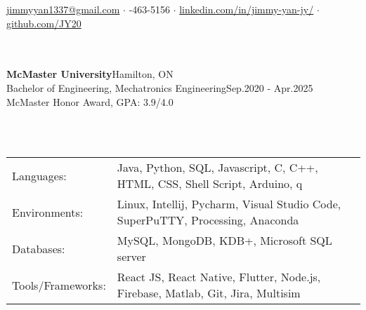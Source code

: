\documentclass[a4paper]{article}
\newcommand{\lineunder} {
    \vspace*{-8pt} \\
    \hspace*{-18pt} \hrulefill \\
}
\newcommand{\header} [1] {
    {\hspace*{-18pt}\vspace*{6pt} \textsc{#1}}
    \vspace*{-6pt} \lineunder
}
\begin{document}
\vspace*{-40pt}

\vspace*{-10pt}
\begin{center}
	\vspace{1mm}
	\color{black}
	\faSend \space \normalsize
	\href{mailto:jimmyyan1337@gmail.com}{jimmyyan1337@gmail.com} $\cdot$ 
	\faPhoneSquare {}-463-5156 $\cdot$ \faLinkedinSquare \space \href{https://www.linkedin.com/in/jimmy-yan-jy/}{linkedin.com/in/jimmy-yan-jy/}
	$\cdot$  
	\faGithub \space \href{https://github.com/JY20}{github.com/JY20}
	\\
\end{center}
\vspace{-2mm}
\header{\textbf{}}
\normalsize
\textbf{McMaster University}\hfill Hamilton, ON\\
Bachelor of Engineering, Mechatronics Engineering\hfill Sep.2020 - Apr.2025
\\McMaster Honor Award, GPA: 3.9/4.0\\
\vspace{1mm}

\header{\textbf{}}
\normalsize
\begin{tabular}{ l l }
	Languages:        & Java, Python, SQL, Javascript, C, C++, HTML, CSS, Shell Script, Arduino, q     \\
	Environments:     & Linux, Intellij, Pycharm, Visual Studio Code, SuperPuTTY, Processing, Anaconda \\
	Databases: &   MySQL, MongoDB, KDB+, Microsoft SQL server \\
	Tools/Frameworks:      & React JS, React Native, Flutter, Node.js, Firebase, Matlab, Git, Jira, Multisim\\
\end{tabular}
\vspace{1mm}
\end{document}
